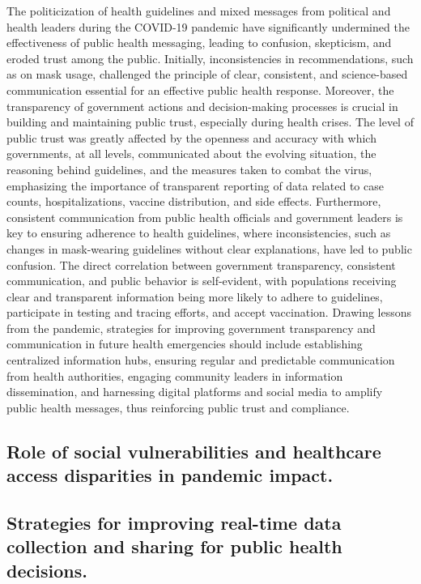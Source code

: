 \documentclass[
  letterpaper,
  DIV=11,
  numbers=noendperiod]{scrartcl}
\begin{document}
The politicization of health guidelines and mixed messages from
political and health leaders during the COVID-19 pandemic have
significantly undermined the effectiveness of public health messaging,
leading to confusion, skepticism, and eroded trust among the public.
Initially, inconsistencies in recommendations, such as on mask usage,
challenged the principle of clear, consistent, and science-based
communication essential for an effective public health response.
Moreover, the transparency of government actions and decision-making
processes is crucial in building and maintaining public trust,
especially during health crises. The level of public trust was greatly
affected by the openness and accuracy with which governments, at all
levels, communicated about the evolving situation, the reasoning behind
guidelines, and the measures taken to combat the virus, emphasizing the
importance of transparent reporting of data related to case counts,
hospitalizations, vaccine distribution, and side effects. Furthermore,
consistent communication from public health officials and government
leaders is key to ensuring adherence to health guidelines, where
inconsistencies, such as changes in mask-wearing guidelines without
clear explanations, have led to public confusion. The direct correlation
between government transparency, consistent communication, and public
behavior is self-evident, with populations receiving clear and
transparent information being more likely to adhere to guidelines,
participate in testing and tracing efforts, and accept vaccination.
Drawing lessons from the pandemic, strategies for improving government
transparency and communication in future health emergencies should
include establishing centralized information hubs, ensuring regular and
predictable communication from health authorities, engaging community
leaders in information dissemination, and harnessing digital platforms
and social media to amplify public health messages, thus reinforcing
public trust and compliance.

\subsection{Role of social vulnerabilities and healthcare access
disparities in pandemic
impact.}\label{role-of-social-vulnerabilities-and-healthcare-access-disparities-in-pandemic-impact.}

\subsection{Strategies for improving real-time data collection and
sharing for public health
decisions.}\label{strategies-for-improving-real-time-data-collection-and-sharing-for-public-health-decisions.}
\end{document}
